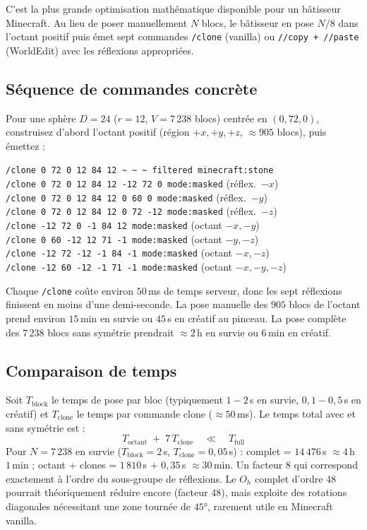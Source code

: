 \documentclass[12pt,a4paper]{scrartcl}
\newcommand{\cmd}[1]{\textcolor{earth}{\texttt{\small #1}}}
\begin{document}
C'est la plus grande optimisation mathématique disponible pour un bâtisseur Minecraft. Au lieu de poser manuellement $N$ blocs, le bâtisseur en pose $N/8$ dans l'octant positif puis émet sept commandes \cmd{/clone} (vanilla) ou \cmd{//copy + //paste} (WorldEdit) avec les réflexions appropriées.

\subsection{Séquence de commandes concrète}
Pour une sphère $D=24$ ($r=12$, $V = 7\,238$ blocs) centrée en $(0,72,0)$, construisez d'abord l'octant positif (région $+x, +y, +z$, $\approx 905$ blocs), puis émettez :

\begin{minec}
\cmd{/clone 0 72 0 12 84 12 \textasciitilde\,\textasciitilde\,\textasciitilde\ filtered minecraft:stone}\\
\cmd{/clone 0 72 0 12 84 12 -12 72 0 mode:masked} \quad (réflex.\ \(-x\))\\
\cmd{/clone 0 72 0 12 84 12 0 60 0 mode:masked} \quad\quad (réflex.\ \(-y\))\\
\cmd{/clone 0 72 0 12 84 12 0 72 -12 mode:masked} \quad (réflex.\ \(-z\))\\
\cmd{/clone -12 72 0 -1 84 12 mode:masked} \quad\quad\quad\;\; (octant \(-x,-y\))\\
\cmd{/clone 0 60 -12 12 71 -1 mode:masked} \quad\quad\quad (octant \(-y,-z\))\\
\cmd{/clone -12 72 -12 -1 84 -1 mode:masked} \quad\;\; (octant \(-x,-z\))\\
\cmd{/clone -12 60 -12 -1 71 -1 mode:masked} \quad\;\; (octant \(-x,-y,-z\))
\end{minec}

Chaque \cmd{/clone} coûte environ $50$\,ms de temps serveur, donc les sept réflexions finissent en moins d'une demi-seconde. La pose manuelle des $905$ blocs de l'octant prend environ $15$\,min en survie ou $45$\,s en créatif au pinceau. La pose complète des $7\,238$ blocs sans symétrie prendrait $\approx 2$\,h en survie ou $6$\,min en créatif.

\subsection{Comparaison de temps}
Soit $T_{\mathrm{block}}$ le temps de pose par bloc (typiquement $1{-}2$\,s en survie, $0{,}1{-}0{,}5$\,s en créatif) et $T_{\mathrm{clone}}$ le temps par commande clone ($\approx 50$\,ms). Le temps total avec et sans symétrie est :
\[
T_{\mathrm{octant}} \;+\; 7\,T_{\mathrm{clone}}
\quad\ll\quad
T_{\mathrm{full}}
\]
Pour $N = 7\,238$ en survie ($T_{\mathrm{block}} = 2$\,s, $T_{\mathrm{clone}} = 0{,}05$\,s) : complet = $14\,476$\,s $\approx 4$\,h $1$\,min ; octant + clones = $1\,810$\,s + $0{,}35$\,s $\approx 30$\,min. Un facteur $8$ qui correspond exactement à l'ordre du sous-groupe de réflexions. Le $O_h$ complet d'ordre $48$ pourrait théoriquement réduire encore (facteur $48$), mais exploite des rotations diagonales nécessitant une zone tournée de $45°$, rarement utile en Minecraft vanilla.
\end{document}
